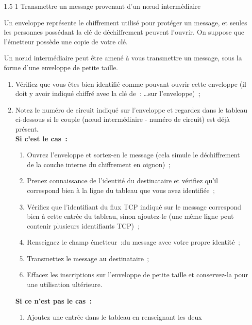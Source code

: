 \documentclass[a4paper,twoside,french]{article}
\makeatletter
\renewcommand\section{\@startsection
  {section}{1}{1cm}%
  {1.5\baselineskip}%
  {1\baselineskip}%
  {\normalfont\Large\bfseries}}%
\makeatother
\begin{document}
  \section{Transmettre un message provenant d'un n\oe ud intermédiaire}

  Un enveloppe représente le chiffrement utilisé pour protéger un
  message, et seules les personnes possédant la clé de déchiffrement
  peuvent l'ouvrir. On suppose que l'émetteur possède une copie de
  votre clé.

  Un n\oe ud intermédiaire peut être amené à vous transmettre un
  message, sous la forme d'une enveloppe de petite taille.

  \begin{enumerate}
  \item Vérifiez que vous êtes bien identifié comme pouvant ouvrir
    cette enveloppe (il doit y avoir indiqué \og chiffré avec la clé
    de~: \ldots\fg sur l'enveloppe)~;
  \item Notez le numéro de circuit indiqué sur l'enveloppe et regardez
    dans le tableau ci-dessous si le couple (n\oe ud intermédiaire -
    numéro de circuit) est déjà présent.\\
    \textbf{Si c'est le cas~:}
    \begin{enumerate}
    \item Ouvrez l'enveloppe et sortez-en le message (cela simule le
      déchiffrement de la couche interne du chiffrement en oignon)~;
    \item Prenez connaissance de l'identité du destinataire et
      vérifiez qu'il correspond bien à la ligne du tableau que vous
      avez identifiée~;
    \item Vérifiez que l'identifiant du flux TCP indiqué sur le
      message correspond bien à cette entrée du tableau, sinon
      ajoutez-le (une même ligne peut contenir plusieurs identifiants
      TCP)~;
    \item Renseignez le champ \og émetteur~:\fg du message avec votre
      propre identité~;
    \item Transmettez le message au destinataire~;
    \item Effacez les inscriptions sur l'enveloppe de petite taille et
      conservez-la pour une utilisation ultérieure.
    \end{enumerate}
    \textbf{Si ce n'est pas le cas~:}
    \begin{enumerate}
    \item Ajoutez une entrée dans le tableau en renseignant les deux

\end{enumerate}
\end{enumerate}
\end{document}

